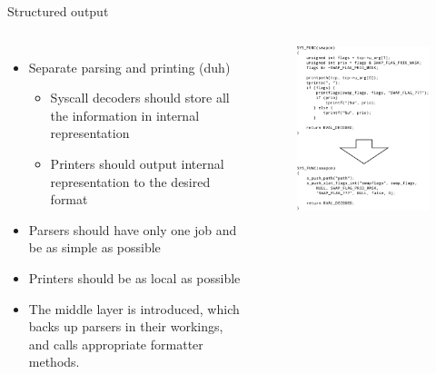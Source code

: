 \documentclass[unicode,aspectratio=169]{beamer}
\begin{document}
\begin{frame}{Structured output}
\begin{columns}
	\column{8.4cm}
\begin{itemize}
  \item Separate parsing and printing (duh)
  \begin{itemize}
    \item Syscall decoders should store all the information in internal representation
    \item Printers should output internal representation to the desired format
  \end{itemize}
  \item Parsers should have only one job and be as simple as possible
  \item Printers should be as local as possible
  \item The middle layer is introduced, which backs up parsers in their workings, and calls appropriate formatter methods.
\end{itemize}
	\column{5.6cm}
		\begin{figure}[h]
			\includegraphics[width=1.0\textwidth]{lp0-conversion}
		\end{figure}
\end{columns}
\end{frame}
\end{document}
